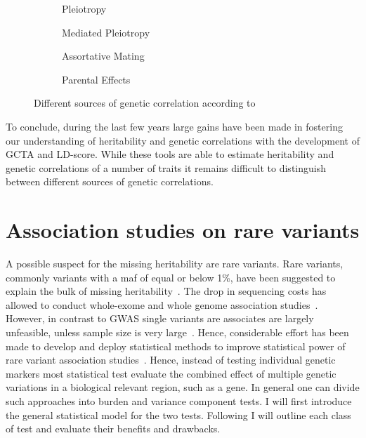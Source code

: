 \begin{figure}[htp]
  \begin{subfigure}[t]{0.5\textwidth}
    \centering
    \resizebox{0.5\linewidth}{!}{} 
    \caption{Pleiotropy}\label{fig:pleiotropy}
  \end{subfigure}
  \begin{subfigure}[t]{0.5\textwidth}
    \centering
    \resizebox{0.5\linewidth}{!}{} 
    \caption{Mediated Pleiotropy}\label{fig:mediated_pleiotropy}
  \end{subfigure}
  \begin{subfigure}[t]{0.5\textwidth}
    \centering
    \resizebox{0.6\linewidth}{!}{} 
    \caption{Assortative Mating}\label{fig:assortative_mating}
  \end{subfigure}
  \begin{subfigure}[t]{0.5\textwidth}
    \centering
    \resizebox{0.6\linewidth}{!}{}
    \caption{Parental Effects}\label{fig:parental_effects}
  \end{subfigure}
  \caption{Different sources of genetic correlation according to~\citet{Pickrell2016}}\label{fig:genetic_correlation}
\end{figure}

To conclude, during the last few years large gains have been made in fostering our understanding of heritability and genetic correlations with the development of GCTA and LD-score.
While these tools are able to estimate heritability and genetic correlations of a number of traits it remains difficult to distinguish between different sources of genetic correlations.

\section{Association studies on rare variants}
\label{sec:association_studies_on_rare_varitants}

A possible suspect for the missing heritability are rare variants.
Rare variants, commonly variants with a \acrfull{maf} of equal or below 1\%, have been suggested to explain the bulk of missing heritability~\cite{Jiang2013,Li2009a}.
The drop in sequencing costs has allowed to conduct whole-exome and whole genome association studies~\cite{Goodwin2016}.
However, in contrast to GWAS single variants are associates are largely unfeasible, unless sample size is very large~\cite{Lee2014}.
Hence, considerable effort has been made to develop and deploy statistical methods to improve statistical power of rare variant association studies~\cite{Morris2010,Zeng2014,Daye2012,Manuscript2013}.
Hence, instead of testing individual genetic markers most statistical test evaluate the combined effect of multiple genetic variations in a biological relevant region, such as a gene.
In general one can divide such approaches into burden and variance component tests.
I will first introduce the general statistical model for the two tests.
Following I will outline each class of test and evaluate their benefits and drawbacks.

